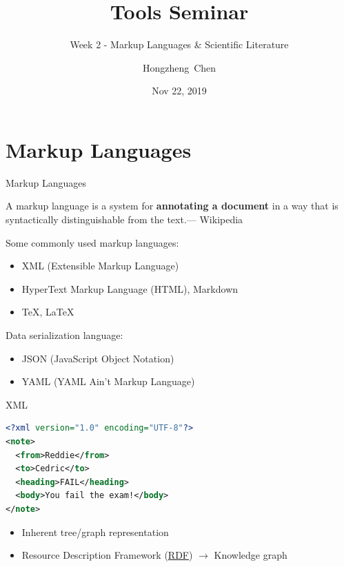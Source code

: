 \documentclass{../TexTemplate/myslide}
\title[ToolsSeminar]{Tools Seminar}
\subtitle{Week 2 - Markup Languages \& Scientific Literature}
\author[chhzh123]{Hongzheng~Chen}
\date[Nov 22, 2019]{Nov 22, 2019}
\begin{document}
\begin{frame}
\titlepage
\end{frame}

\begin{frame}
\tableofcontents
\end{frame}

\section{Markup Languages}
\begin{frame}
\sectionpage
\end{frame}

\begin{frame}{Markup Languages}
\begin{flushleft}
A markup language is a system for \textbf{annotating a document} in a way that is syntactically distinguishable from the text.\hfill --- Wikipedia
\end{flushleft}
Some commonly used markup languages:
\begin{itemize}
\item XML (Extensible Markup Language)
\item HyperText Markup Language (HTML), Markdown
\item \TeX, \LaTeX
\end{itemize}
Data serialization language:
\begin{itemize}
\item JSON (JavaScript Object Notation)
\item YAML (YAML Ain't Markup Language)
\end{itemize}
\end{frame}

\begin{frame}[fragile]{XML}
\begin{lstlisting}[language=xml]
<?xml version="1.0" encoding="UTF-8"?>
<note>
  <from>Reddie</from>
  <to>Cedric</to>
  <heading>FAIL</heading>
  <body>You fail the exam!</body>
</note>
\end{lstlisting}
\begin{itemize}
\item Inherent tree/graph representation
\item Resource Description Framework (\href{https://www.w3schools.com/xml/xml_rdf.asp}{RDF}) $\to$ Knowledge graph
\end{itemize}
\end{frame}
\end{document}
